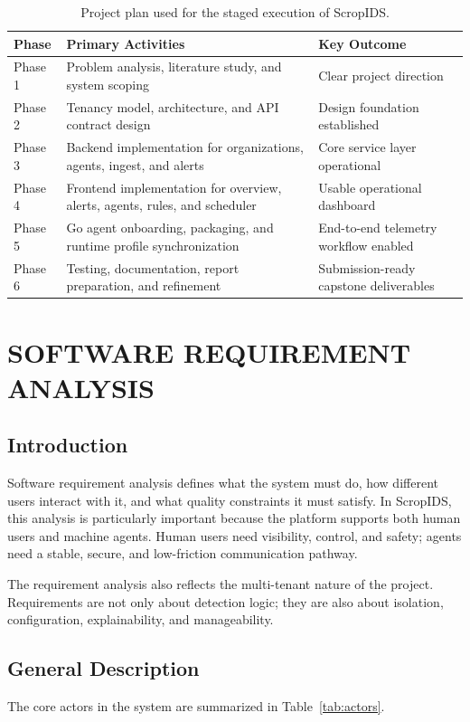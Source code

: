 \documentclass[12pt,a4paper]{article}
\begin{document}
\begin{table}[H]
\centering
\begin{tabularx}{\textwidth}{L{2.2cm}Y Y}
\toprule
\textbf{Phase} & \textbf{Primary Activities} & \textbf{Key Outcome} \\
\midrule
Phase 1 & Problem analysis, literature study, and system scoping & Clear project direction \\
Phase 2 & Tenancy model, architecture, and API contract design & Design foundation established \\
Phase 3 & Backend implementation for organizations, agents, ingest, and alerts & Core service layer operational \\
Phase 4 & Frontend implementation for overview, alerts, agents, rules, and scheduler & Usable operational dashboard \\
Phase 5 & Go agent onboarding, packaging, and runtime profile synchronization & End-to-end telemetry workflow enabled \\
Phase 6 & Testing, documentation, report preparation, and refinement & Submission-ready capstone deliverables \\
\bottomrule
\end{tabularx}
\caption{Project plan used for the staged execution of ScropIDS.}
\label{tab:project-plan}
\end{table}

\clearpage
\section{SOFTWARE REQUIREMENT ANALYSIS}

\subsection{Introduction}
Software requirement analysis defines what the system must do, how different users interact with it, and what quality constraints it must satisfy. In ScropIDS, this analysis is particularly important because the platform supports both human users and machine agents. Human users need visibility, control, and safety; agents need a stable, secure, and low-friction communication pathway.

The requirement analysis also reflects the multi-tenant nature of the project. Requirements are not only about detection logic; they are also about isolation, configuration, explainability, and manageability.

\subsection{General Description}
The core actors in the system are summarized in Table~\ref{tab:actors}.
\end{document}
